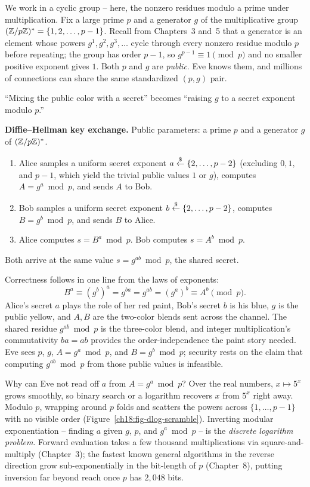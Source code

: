 We work in a cyclic group -- here, the nonzero residues modulo a prime under multiplication. Fix a large prime $p$ and a generator $g$ of the multiplicative group $(\mathbb{Z}/p\mathbb{Z})^{*} = \{1, 2, \dots, p-1\}$. Recall from Chapters~3 and~5 that a generator is an element whose powers $g^1, g^2, g^3, \dots$ cycle through every nonzero residue modulo $p$ before repeating; the group has order $p-1$, so $g^{p-1} \equiv 1 \pmod p$ and no smaller positive exponent gives $1$. Both $p$ and $g$ are \emph{public}. Eve knows them, and millions of connections can share the same standardized $(p, g)$ pair.

``Mixing the public color with a secret'' becomes ``raising $g$ to a secret exponent modulo $p$.''

\begin{focusbox}
\textbf{Diffie--Hellman key exchange.} Public parameters: a prime $p$ and a generator $g$ of $(\mathbb{Z}/p\mathbb{Z})^{*}$.
\begin{enumerate}
  \item Alice samples a uniform secret exponent $a \stackrel{\$}{\gets} \{2, \dots, p-2\}$ (excluding $0, 1,$ and $p-1$, which yield the trivial public values $1$ or $g$), computes $A = g^a \bmod p$, and sends $A$ to Bob.
  \item Bob samples a uniform secret exponent $b \stackrel{\$}{\gets} \{2, \dots, p-2\}$, computes $B = g^b \bmod p$, and sends $B$ to Alice.
  \item Alice computes $s = B^a \bmod p$. Bob computes $s = A^b \bmod p$.
\end{enumerate}
Both arrive at the same value $s = g^{ab} \bmod p$, the shared secret.
\end{focusbox}

Correctness follows in one line from the laws of exponents:
\[
  B^a \equiv (g^b)^a = g^{ba} = g^{ab} = (g^a)^b \equiv A^b \pmod p.
\]
Alice's secret $a$ plays the role of her red paint, Bob's secret $b$ is his blue, $g$ is the public yellow, and $A, B$ are the two-color blends sent across the channel. The shared residue $g^{ab} \bmod p$ is the three-color blend, and integer multiplication's commutativity $ba = ab$ provides the order-independence the paint story needed. Eve sees $p$, $g$, $A = g^a \bmod p$, and $B = g^b \bmod p$; security rests on the claim that computing $g^{ab} \bmod p$ from those public values is infeasible.

\begin{whybox}
Why can Eve not read off $a$ from $A = g^a \bmod p$? Over the real numbers, $x \mapsto 5^x$ grows smoothly, so binary search or a logarithm recovers $x$ from $5^x$ right away. Modulo $p$, wrapping around $p$ folds and scatters the powers across $\{1, \dots, p-1\}$ with no visible order (Figure~\ref{ch18:fig-dlog-scramble}). Inverting modular exponentiation -- finding $a$ given $g$, $p$, and $g^a \bmod p$ -- is the \emph{discrete logarithm problem}. Forward evaluation takes a few thousand multiplications via square-and-multiply (Chapter~3); the fastest known general algorithms in the reverse direction grow sub-exponentially in the bit-length of $p$ (Chapter~8), putting inversion far beyond reach once $p$ has $2{,}048$ bits.
\end{whybox}

